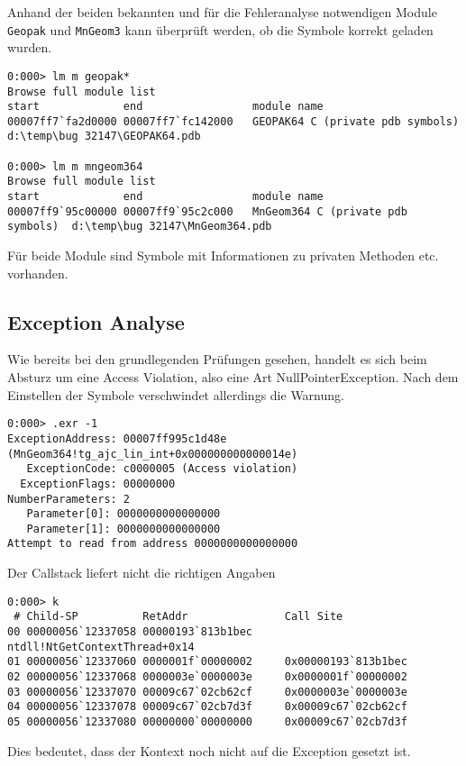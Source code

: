 Anhand der beiden bekannten und für die Fehleranalyse notwendigen Module \verb|Geopak| und \verb|MnGeom3| kann überprüft werden, ob die Symbole korrekt geladen wurden.

\begin{lstlisting}
0:000> lm m geopak*
Browse full module list
start             end                 module name
00007ff7`fa2d0000 00007ff7`fc142000   GEOPAK64 C (private pdb symbols)  d:\temp\bug 32147\GEOPAK64.pdb

0:000> lm m mngeom364
Browse full module list
start             end                 module name
00007ff9`95c00000 00007ff9`95c2c000   MnGeom364 C (private pdb symbols)  d:\temp\bug 32147\MnGeom364.pdb
\end{lstlisting}

Für beide Module sind Symbole mit Informationen zu privaten Methoden etc. vorhanden.

\subsection{Exception Analyse}

Wie bereits bei den grundlegenden Prüfungen gesehen, handelt es sich beim Absturz um eine Access Violation, also eine Art NullPointerException. Nach dem Einstellen der Symbole verschwindet allerdings die Warnung.

\begin{lstlisting}
0:000> .exr -1
ExceptionAddress: 00007ff995c1d48e (MnGeom364!tg_ajc_lin_int+0x000000000000014e)
   ExceptionCode: c0000005 (Access violation)
  ExceptionFlags: 00000000
NumberParameters: 2
   Parameter[0]: 0000000000000000
   Parameter[1]: 0000000000000000
Attempt to read from address 0000000000000000
\end{lstlisting}

Der Callstack liefert nicht die richtigen Angaben

\begin{lstlisting}
0:000> k
 # Child-SP          RetAddr               Call Site
00 00000056`12337058 00000193`813b1bec     ntdll!NtGetContextThread+0x14
01 00000056`12337060 0000001f`00000002     0x00000193`813b1bec
02 00000056`12337068 0000003e`0000003e     0x0000001f`00000002
03 00000056`12337070 00009c67`02cb62cf     0x0000003e`0000003e
04 00000056`12337078 00009c67`02cb7d3f     0x00009c67`02cb62cf
05 00000056`12337080 00000000`00000000     0x00009c67`02cb7d3f
\end{lstlisting}

Dies bedeutet, dass der Kontext noch nicht auf die Exception gesetzt ist.

